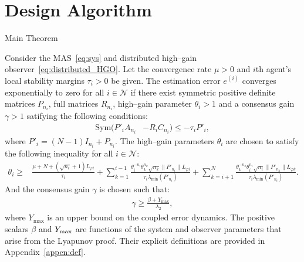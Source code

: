 \section{Design Algorithm}
\begin{frame}{Main Theorem}

    \begin{theorem}\label{thm:main result}
        \scriptsize
        Consider the MAS~\eqref{eq:sys} and distributed high--gain observer~\eqref{eq:distributed_HGO}. 
        Let the convergence rate $\mu>0$ and $i$th agent's local stability margins $\tau_i>0$ be given. The estimation error $e^{(i)}$ converges exponentially to zero for all $i\in\mathcal{N}$ if there exist symmetric positive definite matrices $P_{n_i}$, full matrices $R_{n_i}$, high--gain parameter $\theta_i>1$ and a consensus gain $\gamma>1$ satifying the following conditions:
        \begin{equation}
            \begin{aligned}
                \mathrm{Sym} \Big( P'_iA_{n_i}  &-R_iC_{n_i}\Big)\le -\tau_iP'_i,
            \end{aligned}\label{eq:condition_DSTDHGO_LMIs}
        \end{equation}
        where $P'_i=(N-1)I_{n_i}+P_{n_i}$.
        The high--gain parameters $\theta_i$ are chosen to satisfy the following inequality for all $i \in \mathcal{N}$:
            \begin{align}
                     \theta_i \ge& \frac{\mu+N+(\sqrt{n_i}+1)L_{\varphi i}}{\tau_i} 
                + \sum_{k=1}^{i-1}\frac{\theta_i^{-n_i}\theta_k^{n_k}\sqrt{n_k}\|P'_{n_i}\|L_{\varphi i}}{\tau_i\lambda_{\min}(P'_{n_i})} + \sum_{k=i+1}^{N}\frac{ \theta_k^{-n_k}\theta_i^{n_i}\sqrt{n_i}\|P'_{n_k}\|L_{\varphi k}}{\tau_i\lambda_{\min}(P'_{n_i})}.
                \label{eq:condition_theta}
            \end{align}
        And the consensus gain $\gamma$ is chosen such that:
            \begin{equation}
                \begin{aligned}
                   \gamma \ge \frac{\beta + Y_{\max}}{\lambda_{2}},
                \end{aligned}\label{eq:condition_gamma}
            \end{equation}
    where $Y_{\max}$ is an upper bound on the coupled error dynamics. The positive scalars $\beta$ and $Y_{\rm max}$ are functions of the system and observer parameters that arise from the Lyapunov proof. Their explicit definitions are provided in Appendix~\ref{appen:def}.
    \end{theorem}

\end{frame}

